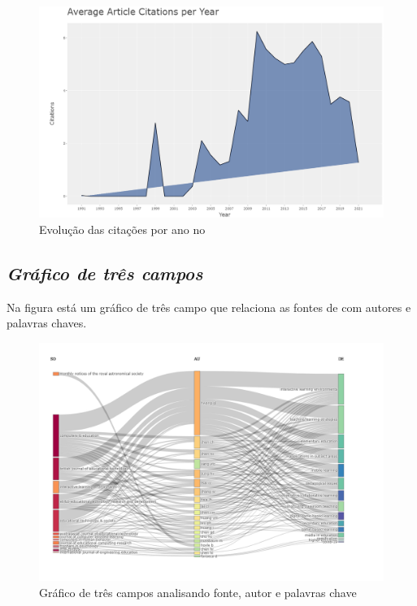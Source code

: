 \begin{figure}[ht]
    \centering
    \includegraphics[width=12cm]{experiments/MarcusABR/PesquisaBibliometrica/Imagens/newplot(1).png}
    \caption{Evolução das citações por ano no \dataset\ }
    \label{fig:citation-year}
\end{figure}

\subsection{\textit{Gráfico de três campos}}

Na figura está um gráfico de três campo que relaciona as fontes de com autores e palavras chaves.

\begin{figure}[ht]
    \centering
    \includegraphics[width=12cm]{experiments/MarcusABR/PesquisaBibliometrica/Imagens/newplot(3).png}
    \caption{Gráfico de três campos analisando fonte, autor e palavras chave}
    \label{fig:three-field}
\end{figure}

